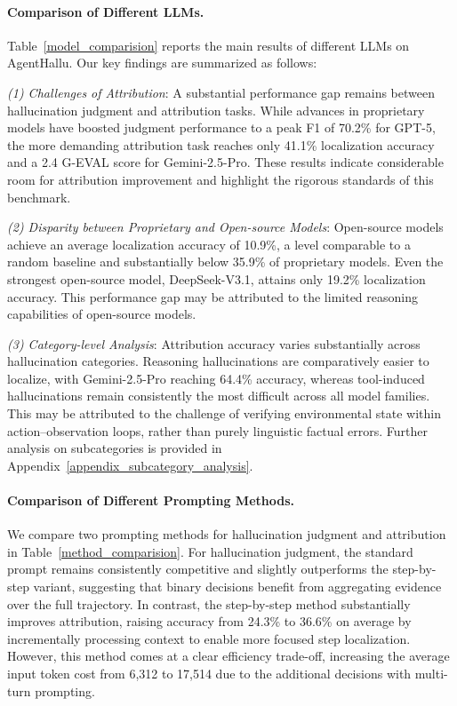 \paragraph{Comparison of Different LLMs.} Table~\ref{model_comparision} reports the main results of different LLMs on AgentHallu. Our key findings are summarized as follows:

\textit{(1) Challenges of Attribution}: A substantial performance gap remains between hallucination judgment and attribution tasks. While advances in proprietary models have boosted judgment performance to a peak F1 of 70.2\% for GPT-5, the more demanding attribution task reaches only 41.1\% localization accuracy and a 2.4 G-EVAL score for Gemini-2.5-Pro. These results indicate considerable room for attribution improvement and highlight the rigorous standards of this benchmark.

\textit{(2) Disparity between Proprietary and Open-source Models}: Open-source models achieve an average localization accuracy of 10.9\%, a level comparable to a random baseline and substantially below 35.9\% of proprietary models. Even the strongest open-source model, DeepSeek-V3.1, attains only 19.2\% localization accuracy. This performance gap may be attributed to the limited reasoning capabilities of open-source models.

\textit{(3) Category-level Analysis}:
Attribution accuracy varies substantially across hallucination categories. Reasoning hallucinations are comparatively easier to localize, with Gemini-2.5-Pro reaching 64.4\% accuracy, whereas tool-induced hallucinations remain consistently the most difficult across all model families. This may be attributed to the challenge of verifying environmental state within action–observation loops, rather than purely linguistic factual errors. Further analysis on subcategories is provided in Appendix~\ref{appendix_subcategory_analysis}.



\paragraph{Comparison of Different Prompting Methods.}
We compare two prompting methods for hallucination judgment and attribution in Table~\ref{method_comparision}.
For hallucination judgment, the standard prompt remains consistently competitive and slightly outperforms the step-by-step variant, suggesting that binary decisions benefit from aggregating evidence over the full trajectory. In contrast, the step-by-step method substantially improves attribution, raising accuracy from 24.3\% to 36.6\% on average by incrementally processing context to enable more focused step localization. However, this method comes at a clear efficiency trade-off, increasing the average input token cost from 6,312 to 17,514 due to the additional decisions with multi-turn prompting.

